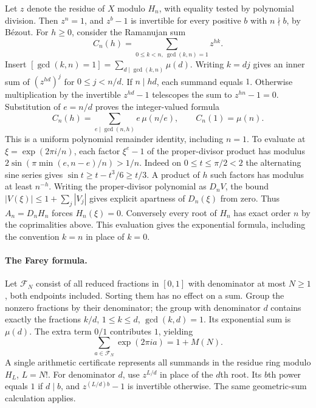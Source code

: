 Let $z$ denote the residue of $X$ modulo $H_n$, with equality tested by
polynomial division. Then $z^n=1$, and $z^b-1$ is invertible for every
positive $b$ with $n\nmid b$, by B\'ezout. For $h\ge0$, consider the
Ramanujan sum
\[
 C_n(h)=\sum_{0\le k<n,\ \gcd(k,n)=1}z^{hk}.
\]
Insert $[\gcd(k,n)=1]=\sum_{d\mid\gcd(k,n)}\mu(d)$. Writing $k=dj$ gives
an inner sum of $(z^{hd})^j$ for $0\le j<n/d$. If $n\mid hd$, each
summand equals $1$. Otherwise multiplication by the invertible $z^{hd}-1$
telescopes the sum to $z^{hn}-1=0$. Substitution of $e=n/d$ proves the
integer-valued formula
\[
       C_n(h)=\sum_{e\mid\gcd(n,h)}e\,\mu(n/e),
       \qquad C_n(1)=\mu(n).
\]
This is a uniform polynomial remainder identity, including $n=1$.
To evaluate at $\xi=\exp(2\pi i/n)$, each factor $\xi^e-1$ of the
proper-divisor product has modulus $2\sin(\pi\min(e,n-e)/n)>1/n$.
Indeed on $0\le t\le\pi/2<2$ the alternating sine series gives
$\sin t\ge t-t^3/6\ge t/3$. A product of $h$ such factors has modulus
at least $n^{-h}$. Writing the proper-divisor polynomial as $D_nV$,
the bound $|V(\xi)|\le 1+\sum_j|V_j|$ gives explicit apartness of
$D_n(\xi)$ from zero. Thus $A_n=D_nH_n$ forces $H_n(\xi)=0$.
Conversely every root of $H_n$ has exact order $n$ by the coprimalities
above. This evaluation gives the exponential formula, including the
convention $k=n$ in place of $k=0$.

\paragraph{The Farey formula.}
Let $\mathcal F_N$ consist of all reduced fractions in $[0,1]$ with
denominator at most $N\ge1$, both endpoints included. Sorting them has
no effect on a sum. Group the nonzero fractions by their denominator;
the group with denominator $d$ contains exactly the fractions $k/d$,
$1\le k\le d$, $\gcd(k,d)=1$. Its exponential sum is $\mu(d)$.
The extra term $0/1$ contributes $1$, yielding
\[
    \sum_{a\in\mathcal F_N}\exp(2\pi i a)=1+M(N).
\]
A single arithmetic certificate represents all summands in the residue
ring modulo $H_L$, $L=N!$. For denominator $d$, use $z^{L/d}$ in place
of the $d$th root. Its $b$th power equals $1$ if $d\mid b$, and
$z^{(L/d)b}-1$ is invertible otherwise. The same geometric-sum
calculation applies.

